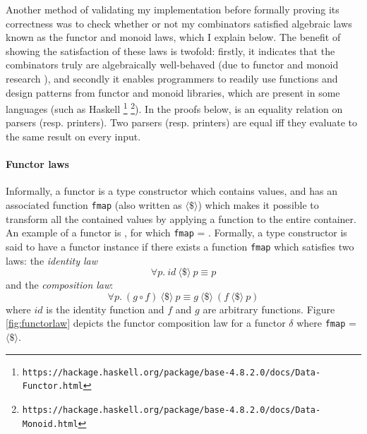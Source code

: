 \documentclass[12pt,a4paper,twoside,openright]{report}
\newcommand{\F}{\AgdaFunction}
\begin{document}
{Another method of validating my implementation before formally proving its correctness was to check whether or not my combinators satisfied algebraic laws known as the functor and monoid laws, which I explain below.  
The benefit of showing the satisfaction of these laws is twofold: firstly, it indicates that the combinators truly are algebraically well-behaved (due to functor and monoid research \cite{functor}), and secondly it enables programmers to readily use functions and design patterns from functor and monoid libraries, which are present in some languages (such as Haskell \footnote{\tt https://hackage.haskell.org/package/base-4.8.2.0/docs/Data-Functor.html} \footnote{\tt https://hackage.haskell.org/package/base-4.8.2.0/docs/Data-Monoid.html}).  
In the proofs below, \F{$\_\!\!\!\approx\!\!\!\_$} is an equality relation on parsers (resp. printers). Two parsers (resp. printers) are equal iff they evaluate to the same result on every input.

\paragraph{Functor laws}

Informally, a functor is a type constructor which contains values, and has an associated function {\tt fmap} (also written as $\langle\$\rangle$) which makes it possible to transform all the contained values by applying a function to the entire container. An example of a functor is \F{List}, for which {\tt fmap} = \F{map}. Formally, a type constructor is said to have a functor instance if there exists a function {\tt fmap} which satisfies two laws: the {\it identity law}
$$\forall p.\ id\ \langle\$\rangle\ p \equiv p$$ 
and the {\it composition law}:
$$\forall p.\ (g \circ f)\ \langle\$\rangle\ p \equiv g\ \langle\$\rangle\ (f\ \langle\$\rangle\ p)$$
where $id$ is the identity function and $f$ and $g$ are arbitrary functions. Figure \ref{fig:functorlaw} depicts the functor composition law for a functor $\delta$ where {\tt fmap} = $\langle\$\rangle$.
\begin{figure}[t] 
\begin{center}
\end{center}
\end{figure}}
\end{document}
